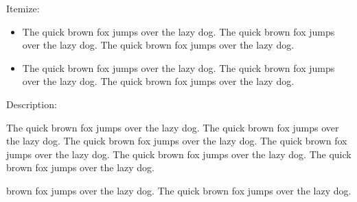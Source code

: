 \documentclass{article}
\begin{document}
Itemize:
\begin{itemize}[wide, labelwidth=!, labelindent=0pt, noitemsep]
  \item The quick brown fox jumps over the lazy dog. The quick brown fox jumps over the lazy dog. The quick brown fox jumps over the lazy dog.
  \item The quick brown fox jumps over the lazy dog. The quick brown fox jumps over the lazy dog. The quick brown fox jumps over the lazy dog.
\end{itemize}


Description:
\begin{description}[wide, labelwidth=!, labelindent=0pt, noitemsep]
  \item[The] The quick brown fox jumps over the lazy dog. The quick brown fox jumps over the lazy dog. The quick brown fox jumps over the lazy dog. The quick brown fox jumps over the lazy dog. The quick brown fox jumps over the lazy dog. The quick brown fox jumps over the lazy dog.
  \item[Quick] brown fox jumps over the lazy dog.  The quick brown fox jumps over the lazy dog.
\end{description}
\end{document}
